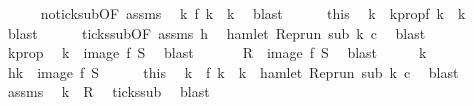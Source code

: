 \begin{isabellebody}
\ \ \ \ \isamarkupfalse%
\ no{\isacharunderscore}tick{\isacharunderscore}sub{\isacharbrackleft}OF\ assms{\isacharbrackright}\ \isamarkupfalse%
\ {\isacartoucheopen}{\isasymexists}k\ f\ k\ {\isacharequal}\ k{\isacartoucheclose}\ \isamarkupfalse%
\ blast\isanewline
\ \ \ \ \isamarkupfalse%
\ this\ \isamarkupfalse%
\ k\ \ k{}prop{\isacharcolon}{\isacartoucheopen}f\ k\ {\isacharequal}\ k{\isacartoucheclose}\ \isamarkupfalse%
\ blast\isanewline
\ \ \ \ \isamarkupfalse%
\ ticks{\isacharunderscore}sub{\isacharbrackleft}OF\ assms{\isacharbrackright}\ h\ \isamarkupfalse%
\ {\isacartoucheopen}hamlet\ {\isacharparenleft}{\isacharparenleft}Rep{\isacharunderscore}run\ sub{\isacharparenright}\ k\ c{\isacharparenright}{\isacartoucheclose}\ \isamarkupfalse%
\ blast\isanewline
\ \ \ \ \isamarkupfalse%
\ k{}prop\ \isamarkupfalse%
\ {\isacartoucheopen}k\ {\isasymin}\ image\ f\ {\isacharquery}S{\isacartoucheclose}\ \isamarkupfalse%
\ blast\isanewline
\ \ \isacommand{{\isacharbraceright}}\isamarkupfalse%
\isanewline
\ \ \isamarkupfalse%
\ {\isacartoucheopen}{\isacharquery}R\ {\isasymsubseteq}\ image\ f\ {\isacharquery}S{\isacartoucheclose}\ \isamarkupfalse%
\ blast\isanewline
{}\isamarkupfalse%
\isanewline
\ \ \isacommand{{\isacharbraceleft}}\isamarkupfalse%
\ \isamarkupfalse%
\ k\ \isamarkupfalse%
\ h{\isacharcolon}{\isacartoucheopen}k\ {\isasymin}\ image\ f\ {\isacharquery}S{\isacartoucheclose}\isanewline
\ \ \ \ \isamarkupfalse%
\ this\ \isamarkupfalse%
\ k\ \ {\isacartoucheopen}f\ k\ {\isacharequal}\ k\ {\isasymand}\ hamlet\ {\isacharparenleft}{\isacharparenleft}Rep{\isacharunderscore}run\ sub{\isacharparenright}\ k\ c{\isacharparenright}{\isacartoucheclose}\ \isamarkupfalse%
\ blast\isanewline
\ \ \ \ \isamarkupfalse%
\ assms\ \isamarkupfalse%
\ {\isacartoucheopen}k\ {\isasymin}\ {\isacharquery}R{\isacartoucheclose}\ \isamarkupfalse%
\ ticks{\isacharunderscore}sub\ \isamarkupfalse%
\ blast\ \isanewline
\ \ \isacommand{{\isacharbraceright}}\isamarkupfalse%

\end{isabellebody}
